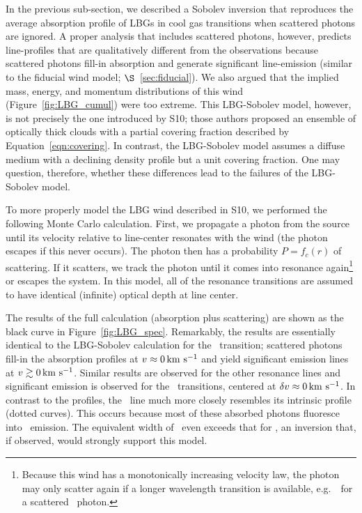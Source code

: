 \documentclass[]{emulateapj}
\begin{document}
In the previous sub-section, we described a Sobolev inversion that
reproduces the average absorption profile of LBGs in cool gas
transitions when scattered photons are ignored.  A proper analysis
that includes scattered photons,
however, predicts line-profiles that are qualitatively
different from the observations because scattered photons fill-in
absorption and generate significant line-emission (similar to the
fiducial wind model; $\S$~\ref{sec:fiducial}).
We also argued that the implied mass, energy, and momentum
distributions of this wind (Figure~\ref{fig:LBG_cumul}) were too
extreme. 
This LBG-Sobolev model, however, is not precisely
the one introduced by S10;  those authors proposed an ensemble of optically
thick clouds with a partial covering fraction described by
Equation~\ref{eqn:covering}.  In contrast, the LBG-Sobolev model assumes
a diffuse medium with a declining density profile but a unit covering
fraction.  One may question, therefore,  whether these differences
lead to the failures of the LBG-Sobolev model. 

To more properly model the LBG wind described in S10, we 
performed the following Monte Carlo calculation.  First, we propagate
a photon from the source until its velocity relative to line-center
resonates with the wind (the photon escapes if this never occurs).
The photon then has a probability $P = f_c(r)$ of scattering.  If it
scatters, we track the photon until it comes into
resonance again\footnote{Because this wind has a monotonically
  increasing velocity law, the photon may only scatter again if a
  longer wavelength transition is available, e.g.\ \mgiib\ for a
  scattered \mgiia\ photon.} or escapes the system.  In this model, all of the
resonance transitions are assumed to have identical (infinite) optical
depth at line center. 

The results of the full calculation (absorption plus scattering) are
shown as the black curve in Figure~\ref{fig:LBG_spec}.  Remarkably, the results
are essentially identical to the LBG-Sobolev calculation for the
\mgiia\ transition; scattered photons fill-in
the absorption profiles at $v \approx 0 \, {\rm km~s^{-1}}$ and yield significant
emission lines at $v \gtrsim 0 \, {\rm km~s^{-1}}$. 
Similar results are observed for the other resonance lines and  
significant emission is observed 
for the \feiis\ transitions, centered at $\delta v \approx 0 \, {\rm km~s^{-1}}$.  
In contrast to the  profiles, the 
\feiia\ line much more closely resembles its intrinsic
profile (dotted curves).  This occurs because most of these
absorbed photons fluoresce into \feiis\ emission.
The equivalent width of \feiia\ even exceeds that for \feiib, an
inversion that, if observed, would strongly support this model.
\end{document}
